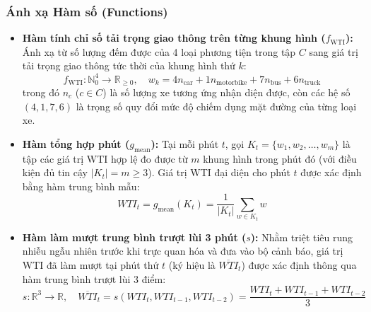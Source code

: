 \subsubsection{Ánh xạ Hàm số (Functions)}
\begin{itemize}
    \item \textbf{Hàm tính chỉ số tải trọng giao thông trên từng khung hình ($f_{\text{WTI}}$):} 
    Ánh xạ từ số lượng đếm được của 4 loại phương tiện trong tập $C$ sang giá trị tải trọng giao thông tức thời của khung hình thứ $k$:
    \begin{equation*}
        f_{\text{WTI}}: \mathbb{N}_0^4 \to \mathbb{R}_{\ge 0}, \quad w_k = 4 n_{\text{car}} + 1 n_{\text{motorbike}} + 7 n_{\text{bus}} + 6 n_{\text{truck}}
    \end{equation*}
    trong đó $n_c$ ($c \in C$) là số lượng xe tương ứng nhận diện được, còn các hệ số $(4, 1, 7, 6)$ là trọng số quy đổi mức độ chiếm dụng mặt đường của từng loại xe.

    \item \textbf{Hàm tổng hợp phút ($g_{\text{mean}}$):} 
    Tại mỗi phút $t$, gọi $K_t = \{w_1, w_2, \dots, w_m\}$ là tập các giá trị WTI hợp lệ đo được từ $m$ khung hình trong phút đó (với điều kiện đủ tin cậy $|K_t| = m \ge 3$). Giá trị WTI đại diện cho phút $t$ được xác định bằng hàm trung bình mẫu:
    \begin{equation*}
        WTI_t = g_{\text{mean}}(K_t) = \frac{1}{|K_t|} \sum_{w \in K_t} w
    \end{equation*}

    \item \textbf{Hàm làm mượt trung bình trượt lùi 3 phút ($s$):} 
    Nhằm triệt tiêu rung nhiễu ngẫu nhiên trước khi trực quan hóa và đưa vào bộ cảnh báo, giá trị WTI đã làm mượt tại phút thứ $t$ (ký hiệu là $\overline{WTI}_t$) được xác định thông qua hàm trung bình trượt lùi 3 điểm:
    \begin{equation*}
        s: \mathbb{R}^3 \to \mathbb{R}, \quad \overline{WTI}_t = s(WTI_t, WTI_{t-1}, WTI_{t-2}) = \frac{WTI_t + WTI_{t-1} + WTI_{t-2}}{3}
    \end{equation*}


\end{itemize}
